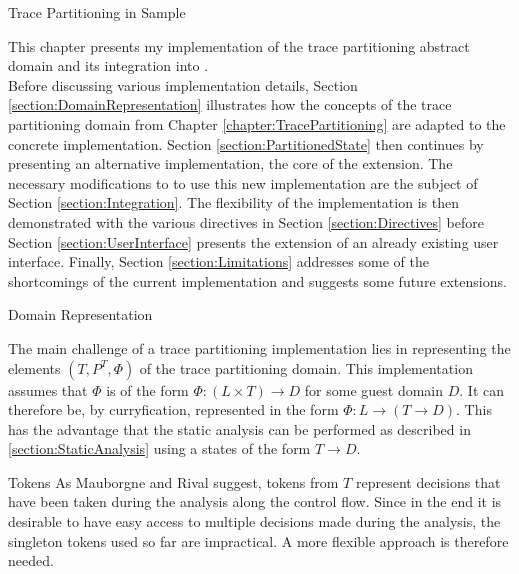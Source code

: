 %

\begin{chapter}{Trace Partitioning in Sample}
	\label{chapter:Extension}

	This chapter presents my implementation of the trace partitioning abstract domain and its integration into \sample.\\

	Before discussing various implementation details, Section \ref{section:DomainRepresentation} illustrates how the concepts of the trace partitioning domain from Chapter \ref{chapter:TracePartitioning} are adapted to the concrete implementation. Section \ref{section:PartitionedState} then continues by presenting an alternative  implementation, the core of the extension. The necessary modifications to \sample to use this new  implementation are the subject of Section \ref{section:Integration}. The flexibility of the implementation is then demonstrated with the various directives in Section \ref{section:Directives} before Section \ref{section:UserInterface} presents the extension of an already existing user interface. Finally, Section \ref{section:Limitations} addresses some of the shortcomings of the current implementation and suggests some future extensions.


	\begin{section}{Domain Representation}
		\label{section:DomainRepresentation}

		The main challenge of a trace partitioning implementation lies in representing the elements $(T, P^T, \Phi)$ of the trace partitioning domain. This implementation assumes that $\Phi$ is of the form $\Phi: (L \times T) \to D$ for some guest domain $D$. It can therefore be, by curryfication, represented in the form $\Phi: L \to (T \to D)$. This has the advantage that the static analysis can be performed as described in \ref{section:StaticAnalysis} using a states of the form $T \to D$. 


		\begin{subsection}{Tokens}
			As Mauborgne and Rival suggest, tokens from $T$ represent decisions that have been taken during the analysis along the control flow. Since in the end it is desirable to have easy access to multiple decisions made during the analysis, the singleton tokens used so far are impractical. A more flexible approach is therefore needed.


\end{subsection}
\end{section}
\end{chapter}
